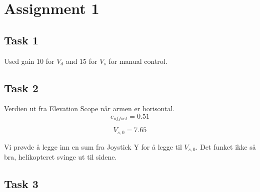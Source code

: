 \section{Assignment 1}

\subsection{Task 1}

Used gain $10$ for $V_d$ and $15$ for $V_s$ for manual control.

\subsection{Task 2}
Verdien ut fra Elevation Scope når armen er horisontal.
$$ e_{offset} = 0.51 $$

$$ V_{s,0} = 7.65 $$

Vi prøvde å legge inn en sum fra Joystick Y for å legge til $V_{s,0}$. Det funket ikke så bra, helikopteret svinge ut til sidene.

\subsection{Task 3}


